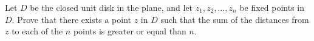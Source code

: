 Let $D$ be the closed unit disk in the plane, and let $z_1,z_2,\ldots,z_n$ be fixed points in $D$. Prove that there exists a point $z$ in $D$ such that the sum of the distances from $z$ to each of the $n$ points is greater or equal than $n$.